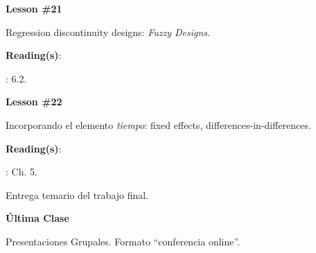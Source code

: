 \documentclass[letterpaper]{article}
\renewenvironment{itemize}{
  \begin{list}{}{
    \setlength{\leftmargin}{1.5em}
  }
}{
  \end{list}
}
\begin{document}
\begin{enumerate}
      \begin{itemize} 
        \item[$\bullet$] {\bf Lesson \#21}
          \begin{itemize} 
            \item[$\circ$] Regression discontinuity designs: \emph{Fuzzy Designs}.
            \item[$\circ$] {\bf Reading(s)}: 
              \begin{itemize}
                \item[$\diamond$] \textcite{Angrist2009}: 6.2.
              \end{itemize}
          \end{itemize}
      \end{itemize}


      \begin{itemize} 
        \item[$\bullet$] {\bf Lesson \#22}
          \begin{itemize} 
            \item[$\circ$] Incorporando el elemento \emph{tiempo}: fixed effects, differences-in-differences.
            \item[$\circ$] {\bf Reading(s)}: 
              \begin{itemize}
                \item[$\diamond$] \textcite{Angrist2009}: Ch. 5.
              \end{itemize}
          \end{itemize}
      \end{itemize}

\item[{\color{red}\Pointinghand}] Entrega temario del trabajo final.

      \begin{itemize} 
        \item[$\bullet$] {\bf \'Ultima Clase}
          \begin{itemize} 
            \item[$\circ$] Presentaciones Grupales. Formato ``conferencia online''.
        \end{itemize}
      \end{itemize}


			

\end{enumerate}


\newpage
{}
\setcounter{page}{1}
\printbibliography
\end{document}
